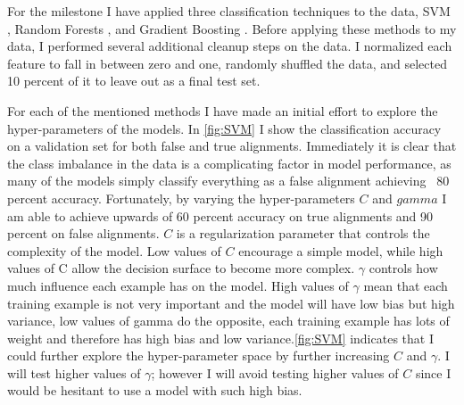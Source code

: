 \documentclass{article}
\begin{document}
For the milestone I have applied three classification techniques to the data, SVM \parencite{Hastie2008}, Random Forests \parencite{Ho1995, Breiman2001}, and Gradient Boosting \parencite{Friedman1999GreedyMachine}. \parencite{Pedregosa2011Scikit-learnPython} Before applying these methods to my data, I performed several additional cleanup steps on the data. I normalized each feature to fall in between zero and one, randomly shuffled the data, and selected 10 percent of it to leave out as a final test set. 

For each of the mentioned methods I have made an initial effort to explore the hyper-parameters of the models. In \autoref{fig:SVM} I show the classification accuracy on a validation set for both false and true alignments. Immediately it is clear that the class imbalance in the data is a complicating factor in model performance, as many of the models simply classify everything as a false alignment achieving ~80 percent accuracy. Fortunately, by varying the hyper-parameters $C$ and $gamma$ I am able to achieve upwards of 60 percent accuracy on true alignments and 90 percent on false alignments. $C$ is a regularization parameter that controls the complexity of the model. Low values of $C$ encourage a simple model, while high values of C allow the decision surface to become more complex. $\gamma$ controls how much influence each example has on the model. High values of $\gamma$ mean that each training example is not very important and the model will have low bias but high variance, low values of gamma do the opposite, each training example has lots of weight and therefore has high bias and low variance.\autoref{fig:SVM} indicates that I could further explore the hyper-parameter space by further increasing $C$ and $\gamma$. I will test higher values of $\gamma$; however I will avoid testing higher values of $C$ since I would be hesitant to use a model with such high bias. 
\end{document}

